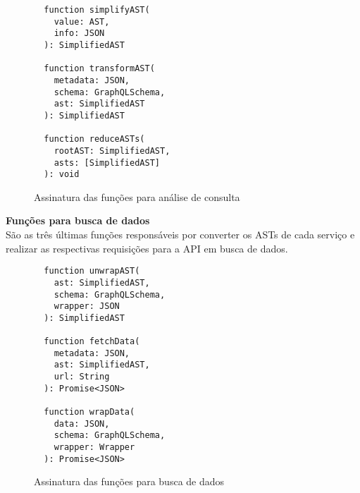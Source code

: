 \begin{figure}[H]
  \centering
  \begin{verbatim}
  function simplifyAST(
    value: AST,
    info: JSON
  ): SimplifiedAST

  function transformAST(
    metadata: JSON,
    schema: GraphQLSchema,
    ast: SimplifiedAST
  ): SimplifiedAST

  function reduceASTs(
    rootAST: SimplifiedAST,
    asts: [SimplifiedAST]
  ): void
  \end{verbatim}
  \caption{Assinatura das funções para análise de consulta}
\end{figure}

\textbf{Funções para busca de dados} \\

São as três últimas funções responsáveis por converter os ASTs de cada serviço e realizar as respectivas requisições para a API em busca de dados.

\begin{figure}[H]
  \centering
  \begin{verbatim}
  function unwrapAST(
    ast: SimplifiedAST,
    schema: GraphQLSchema,
    wrapper: JSON
  ): SimplifiedAST

  function fetchData(
    metadata: JSON,
    ast: SimplifiedAST,
    url: String
  ): Promise<JSON>

  function wrapData(
    data: JSON,
    schema: GraphQLSchema,
    wrapper: Wrapper
  ): Promise<JSON>
  \end{verbatim}
  \caption{Assinatura das funções para busca de dados}
\end{figure}
